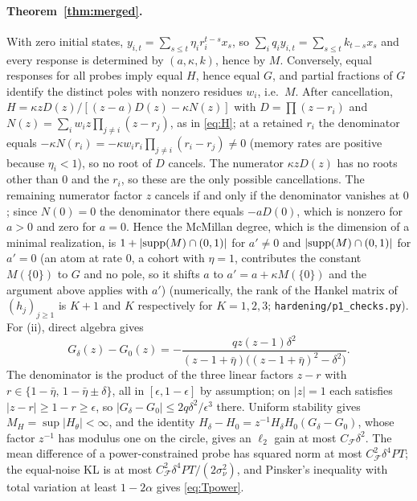 \paragraph{Theorem~\ref{thm:merged}.} With zero initial states, $y_{i,t}=\sum_{s\le t}\eta_ir_i^{t-s}x_s$, so $\sum_iq_iy_{i,t}=\sum_{s\le t}k_{t-s}x_s$ and every response is determined by $(a,\kappa,k)$, hence by $M$. Conversely, equal responses for all probes imply equal $H$, hence equal $G$, and partial fractions of $G$ identify the distinct poles with nonzero residues $w_i$, i.e.\ $M$. After cancellation, $H=\kappa zD(z)/[(z-a)D(z)-\kappa N(z)]$ with $D=\prod(z-r_i)$ and $N(z)=\sum_iw_iz\prod_{j\ne i}(z-r_j)$, as in \eqref{eq:H}; at a retained $r_i$ the denominator equals $-\kappa N(r_i)=-\kappa w_ir_i\prod_{j\ne i}(r_i-r_j)\neq0$ (memory rates are positive because $\eta_i<1$), so no root of $D$ cancels. The numerator $\kappa zD(z)$ has no roots other than $0$ and the $r_i$, so these are the only possible cancellations. The remaining numerator factor $z$ cancels if and only if the denominator vanishes at $0$; since $N(0)=0$ the denominator there equals $-aD(0)$, which is nonzero for $a>0$ and zero for $a=0$. Hence the McMillan degree, which is the dimension of a minimal realization, is $1+|{\rm supp}(M)\cap(0,1)|$ for $a'\neq0$ and $|{\rm supp}(M)\cap(0,1)|$ for $a'=0$ (an atom at rate $0$, a cohort with $\eta=1$, contributes the constant $M(\{0\})$ to $G$ and no pole, so it shifts $a$ to $a'=a+\kappa M(\{0\})$ and the argument above applies with $a'$) (numerically, the rank of the Hankel matrix of $(h_j)_{j\ge1}$ is $K+1$ and $K$ respectively for $K=1,2,3$; \texttt{hardening/p1\_checks.py}). For (ii), direct algebra gives
\[
G_\delta(z)-G_0(z)=-\frac{qz(z-1)\delta^2}{(z-1+\bar\eta)\bigl((z-1+\bar\eta)^2-\delta^2\bigr)} .
\]
The denominator is the product of the three linear factors $z-r$ with $r\in\{1-\bar\eta,\,1-\bar\eta\pm\delta\}$, all in $[\epsilon,1-\epsilon]$ by assumption; on $|z|=1$ each satisfies $|z-r|\ge1-r\ge\epsilon$, so $|G_\delta-G_0|\le2q\delta^2/\epsilon^3$ there. Uniform stability gives $M_H=\sup|H_\theta|<\infty$, and the identity $H_\delta-H_0=z^{-1}H_\delta H_0(G_\delta-G_0)$, whose factor $z^{-1}$ has modulus one on the circle, gives an $\ell_2$ gain at most $C_{\mathcal F}\delta^2$. The mean difference of a power-constrained probe has squared norm at most $C_{\mathcal F}^2\delta^4PT$; the equal-noise KL is at most $C_{\mathcal F}^2\delta^4PT/(2\sigma_\nu^2)$, and Pinsker's inequality with total variation at least $1-2\alpha$ gives \eqref{eq:Tpower}.

